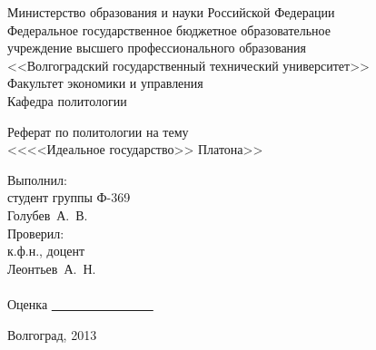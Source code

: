 \documentclass[a4paper, 14pt]{extarticle}
\newcommand{\maketitlepage}[6]{
    \begin{titlepage}
        \singlespacing
        \newpage
        \begin{center}
            Министерство образования и науки Российской Федерации \\
            Федеральное государственное бюджетное образовательное \\
            учреждение высшего профессионального образования \\
            <<Волгоградский государственный технический университет>> \\
            #1 \\
            Кафедра #2
        \end{center}


        \vspace{14em}

        \begin{center}
            \large Реферат по политологии на тему
            \\ <<#3>>
        \end{center}

        \vspace{5em}

        \begin{flushright}
            \begin{minipage}{.3\textwidth}
                Выполнил:\\#4
                \vspace{1em}\\
                Проверил:\\#5
                \\
                \\ Оценка \underline{\ \ \ \ \ \ \ \ \ \ \ \ \ \ \ \ }
            \end{minipage}
        \end{flushright}

        \vspace{\fill}

        \begin{center}
            Волгоград, 2013
        \end{center}

    \end{titlepage}
    \setcounter{page}{2}
}
\begin{document}
    \maketitlepage{Факультет экономики и управления}{политологии}
    {<<Идеальное государство>> Платона}
    {студент группы Ф-369\\Голубев~А.~В.}{к.ф.н., доцент\\Леонтьев~А.~Н.}
    {по политологии}
        
    \tableofcontents
    \thispagestyle{empty}
    \newpage
    
\end{document}
